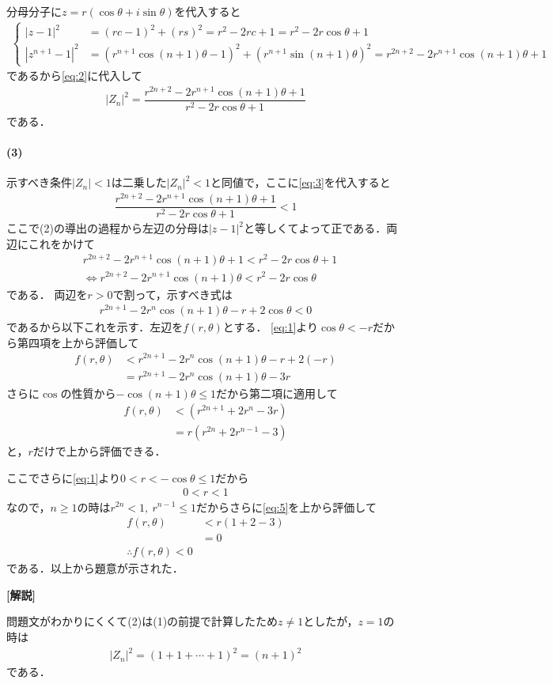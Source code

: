 \documentclass[../../main.tex]{subfiles}
\begin{document}
分母分子に$z=r\left(\cos\theta+i\sin\theta\right)$を代入すると
\begin{align}
  \begin{cases}
    |z-1|^2 &=(rc-1)^2+(rs)^2=r^2-2rc+1=r^2-2r\cos\theta+1 \\
    |z^{n+1}-1|^2 &=\left(r^{n+1}\cos(n+1)\theta-1\right)^2+\left(r^{n+1}\sin(n+1)\theta\right)^2=r^{2n+2}-2r^{n+1}\cos(n+1)\theta+1
  \end{cases}
\end{align}
であるから\cref{eq:2}に代入して
\begin{align}
  |Z_n|^2=\dfrac{r^{2n+2}-2r^{n+1}\cos(n+1)\theta+1}{r^2-2r\cos\theta+1} \label{eq:3}
\end{align}
である．

\paragraph{(3)}

示すべき条件$|Z_n|<1$は二乗した$|Z_n|^2<1$と同値で，ここに\cref{eq:3}を代入すると
\begin{align}
  \dfrac{r^{2n+2}-2r^{n+1}\cos(n+1)\theta+1}{r^2-2r\cos\theta+1} < 1
\end{align}
ここで(2)の導出の過程から左辺の分母は$|z-1|^2$と等しくてよって正である．両辺にこれをかけて
\begin{align}
  & r^{2n+2}-2r^{n+1}\cos(n+1)\theta+1 < r^2-2r\cos\theta+1 \\
  &\iff r^{2n+2}-2r^{n+1}\cos(n+1)\theta<r^2-2r\cos\theta
\end{align}
である．
両辺を$r>0$で割って，示すべき式は
\begin{align}
  r^{2n+1}-2r^n\cos(n+1)\theta-r+2\cos\theta<0 \label{eq:4}
\end{align}
であるから以下これを示す．左辺を$f(r,\theta)$とする．
\cref{eq:1}より$\cos\theta<-r$だから第四項を上から評価して
\begin{align}
  f(r,\theta)
  &< r^{2n+1}-2r^n\cos(n+1)\theta-r+2(-r) \\
  &= r^{2n+1}-2r^n\cos(n+1)\theta-3r
\end{align}
さらに$\cos$の性質から$-\cos(n+1)\theta\le1$だから第二項に適用して
\begin{align}
  f(r,\theta)
  &<\left(r^{2n+1}+2r^{n}-3r\right) \\
  &=r\left(r^{2n}+2r^{n-1}-3\right) \label{eq:5}
\end{align}
と，$r$だけで上から評価できる．

ここでさらに\cref{eq:1}より$0<r<-\cos\theta\le1$だから
\begin{align}
  0 < r < 1
\end{align}
なので，$n \ge 1$の時は$r^{2n}<1,\ r^{n-1}\le1$だからさらに\cref{eq:5}を上から評価して
\begin{align}
  f(r,\theta)
  &<r\left(1+2-3\right) \\
  &=0 \\
  \therefore
  f(r,\theta) < 0
\end{align}
である．以上から題意が示された．

{\bf [解説]}

問題文がわかりにくくて(2)は(1)の前提で計算したため$z\neq 1$としたが，$z=1$の時は
\begin{align}
  |Z_n|^2 = (1+1+\cdots +1)^{2} = (n+1)^2
\end{align}
である．

\newpage
\end{document}
